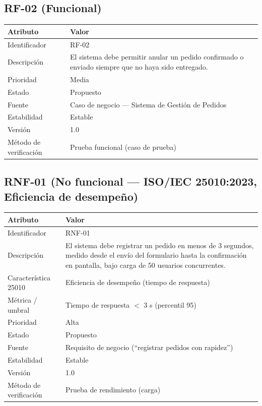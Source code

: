 \documentclass[11pt,letterpaper]{article}
\begin{document}
\subsection*{RF-02 (Funcional)}
\begin{center}\small
\begin{tabular}{lp{10.5cm}}
\toprule
\textbf{Atributo} & \textbf{Valor} \\
\midrule
Identificador & RF-02 \\
Descripción & El sistema debe permitir anular un pedido confirmado o enviado siempre que no haya sido entregado. \\
Prioridad & Media \\
Estado & Propuesto \\
Fuente & Caso de negocio --- Sistema de Gestión de Pedidos \\
Estabilidad & Estable \\
Versión & 1.0 \\
Método de verificación & Prueba funcional (caso de prueba) \\
\bottomrule
\end{tabular}
\end{center}

\subsection*{RNF-01 (No funcional --- ISO/IEC 25010:2023, Eficiencia de desempeño)}
\begin{center}\small
\begin{tabular}{lp{10.5cm}}
\toprule
\textbf{Atributo} & \textbf{Valor} \\
\midrule
Identificador & RNF-01 \\
Descripción & El sistema debe registrar un pedido en menos de 3 segundos, medido desde el envío del formulario hasta la confirmación en pantalla, bajo carga de 50 usuarios concurrentes. \\
Característica 25010 & Eficiencia de desempeño (tiempo de respuesta) \\
Métrica / umbral & Tiempo de respuesta $<$ 3 s (percentil 95) \\
Prioridad & Alta \\
Estado & Propuesto \\
Fuente & Requisito de negocio (``registrar pedidos con rapidez'') \\
Estabilidad & Estable \\
Versión & 1.0 \\
Método de verificación & Prueba de rendimiento (carga) \\
\bottomrule
\end{tabular}
\end{center}
\end{document}
